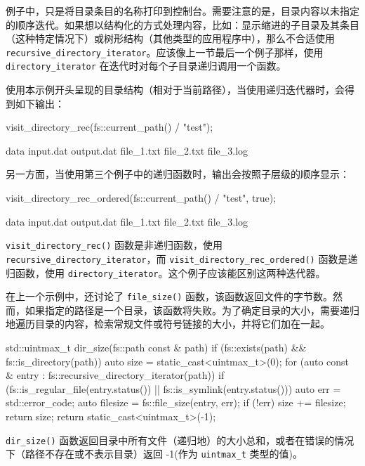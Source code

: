 例子中，只是将目录条目的名称打印到控制台。需要注意的是，目录内容以未指定的顺序迭代。如果想以结构化的方式处理内容，比如：显示缩进的子目录及其条目（这种特定情况下）或树形结构（其他类型的应用程序中），那么不合适使用 \verb|recursive_directory_iterator|。应该像上一节最后一个例子那样，使用 \verb|directory_iterator| 在迭代时对每个子目录递归调用一个函数。

使用本示例开头呈现的目录结构（相对于当前路径），当使用递归迭代器时，会得到如下输出：

\begin{cpp}
visit_directory_rec(fs::current_path() / "test");
\end{cpp}

\begin{shell}
[+]data
    input.dat
    output.dat
    file_1.txt
    file_2.txt
    file_3.log
\end{shell}

另一方面，当使用第三个例子中的递归函数时，输出会按照子层级的顺序显示：

\begin{cpp}
visit_directory_rec_ordered(fs::current_path() / "test", true);
\end{cpp}

\begin{shell}
[+]data
        input.dat
        output.dat
    file_1.txt
    file_2.txt
    file_3.log
\end{shell}

\verb|visit_directory_rec()| 函数是非递归函数，使用 \verb|recursive_directory_iterator|，而 \verb|visit_directory_rec_ordered()| 函数是递归函数，使用 \verb|directory_iterator|。这个例子应该能区别这两种迭代器。


在上一个示例中，还讨论了 \verb|file_size()| 函数，该函数返回文件的字节数。然而，如果指定的路径是一个目录，该函数将失败。为了确定目录的大小，需要递归地遍历目录的内容，检索常规文件或符号链接的大小，并将它们加在一起。

\begin{cpp}
std::uintmax_t dir_size(fs::path const & path)
{
    if (fs::exists(path) && fs::is_directory(path))
    {
        auto size = static_cast<uintmax_t>(0);
        for (auto const & entry :
        fs::recursive_directory_iterator(path))
        {
            if (fs::is_regular_file(entry.status()) ||
            fs::is_symlink(entry.status()))
            {
                auto err = std::error_code{};
                auto filesize = fs::file_size(entry, err);
                if (!err)
                    size += filesize;
            }
        }
        return size;
    }
    return static_cast<uintmax_t>(-1);
}
\end{cpp}

\verb|dir_size()| 函数返回目录中所有文件（递归地）的大小总和，或者在错误的情况下（路径不存在或不表示目录）返回 -1(作为 \verb|uintmax_t| 类型的值)。


